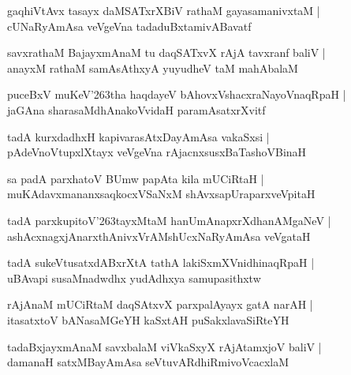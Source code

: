 \documentclass[twoside,12pt,openright]{book}
\def\S{\char'263}
\newcounter{shloka}[chapter]
\begin{document}
\begin{shloka}%
gaqhiVtAvx tasayx daMSATxrXBiV rathaM gayasamanivxtaM |\\
cUNaRyAmAsa veVgeVna tadaduBxtamivABavatf
\end{shloka}

\begin{shloka}%
savxrathaM BajayxmAnaM tu daqSATxvX rAjA tavxranf baliV |\\
anayxM rathaM samAsAthxyA yuyudheV taM mahAbalaM
\end{shloka}

\begin{shloka}%
puceBxV muKeV\S tha haqdayeV bAhovxVshacxraNayoVnaqRpaH |\\
jaGAna sharasaMdhAnakoVvidaH paramAsatxrXvitf 
\end{shloka}

\begin{shloka}%
tadA kurxdadhxH kapivarasAtxDayAmAsa vakaSxsi |\\
pAdeVnoVtupxlXtayx veVgeVna rAjacnxsusxBaTashoVBinaH 
\end{shloka}

\begin{shloka}%
sa padA parxhatoV BUmw papAta kila mUCiRtaH |\\
muKAdavxmananxsaqkocxVSaNxM shAvxsapUraparxveVpitaH 
\end{shloka}

\begin{shloka}%
tadA parxkupitoV\S tayxMtaM hanUmAnapxrXdhanAMgaNeV |\\
ashAcxnagxjAnarxthAnivxVrAMshUcxNaRyAmAsa veVgataH 
\end{shloka}

\begin{shloka}%
tadA sukeVtusatxdABxrXtA tathA lakiSxmXVnidhinaqRpaH |\\
uBAvapi susaMnadwdhx yudAdhxya samupasithxtw 
\end{shloka}

\begin{shloka}%
rAjAnaM mUCiRtaM daqSAtxvX parxpalAyayx gatA narAH |\\
itasatxtoV bANasaMGeYH kaSxtAH puSakxlavaSiRteYH 
\end{shloka}

\begin{shloka}%
tadaBxjayxmAnaM savxbalaM viVkaSxyX rAjAtamxjoV baliV |\\
damanaH satxMBayAmAsa seVtuvARdhiRmivoVcacxlaM 
\end{shloka}
\end{document}
